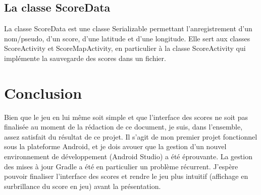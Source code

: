 \documentclass{article}
\begin{document}
\subsection{La classe ScoreData}
La classe ScoreData est une classe Serializable permettant l'anregistrement d'un nom/pseudo, d'un score, d'une latitude et d'une longitude. Elle sert aux classes ScoreActivity et ScoreMapActivity, en particulier à la classe ScoreActivity qui implémente la sauvegarde des scores dans un fichier.

\section{Conclusion}

Bien que le jeu en lui même soit simple et que l'interface des scores ne soit pas finalisée au moment de la rédaction de ce document, je suis, dans l'ensemble, assez satisfait du résultat de ce projet. Il s'agit de mon premier projet fonctionnel sous la plateforme Android, et je dois avouer que la gestion d'un nouvel environnement de développement (Android Studio) a été éprouvante. La gestion des mises à jour Gradle a été en particulier un problème récurrent. J'espère pouvoir finaliser l'interface des scores et rendre le jeu plus  intuitif (affichage en surbrillance du score en jeu) avant la présentation.
\end{document}
